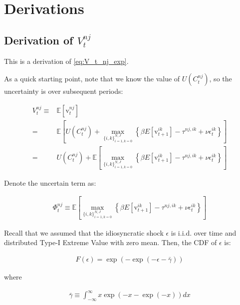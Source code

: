 \documentclass[10pt]{article}
\begin{document}
\section{Derivations}


\subsection{Derivation of $V_t^{n j}$}
\label{sec:V_t_nj_exp}

This is a derivation of \autoref{eq:V_t_nj_exp}.

As a quick starting point, note that we know the 
value of $U\left(C_t^{n j}\right)$, so 
the uncertainty is over subsequent periods:

\begin{align}
    V_t^{n j} \equiv &\mathbb{E}\left[\mathrm{v}_t^{n j}\right] \\
    = &\mathbb{E}\left[U\left(C_t^{n j}\right)+\max _{\{i, k\}_{i=1, k=0}^{N, J}}\left\{\beta E\left[\mathrm{v}_{t+1}^{i k}\right]-\tau^{n j, i k}+\nu \epsilon_t^{i k}\right\}\right] \\
    = &U\left(C_t^{n j}\right)+ \mathbb{E}\left[\max _{\{i, k\}_{i=1, k=0}^{N, J}}\left\{\beta E\left[\mathrm{v}_{t+1}^{i k}\right]-\tau^{n j, i k}+\nu \epsilon_t^{i k}\right\}\right]
\end{align}

Denote the uncertain term as:

\begin{align}
    \Phi_t^{n j} \equiv \mathbb{E}\left[\max _{\{i, k\}_{i=1, k=0}^{N, J}}\left\{\beta E\left[\mathrm{v}_{t+1}^{i k}\right]-\tau^{n j, i k}+\nu \epsilon_t^{i k}\right\}\right]
\end{align}

Recall that we assumed that the idiosyncratic shock $\epsilon$ is i.i.d. over time
and distributed Type-I Extreme Value with zero mean. Then, the 
CDF of $\epsilon$ is:

\begin{align}
    F(\epsilon)=\exp (-\exp (-\epsilon-\bar{\gamma}))
\end{align}

where 

\begin{align}
    \bar{\gamma} \equiv \int_{-\infty}^{\infty} x \exp (-x-\exp (-x)) d x
\end{align}
\end{document}

